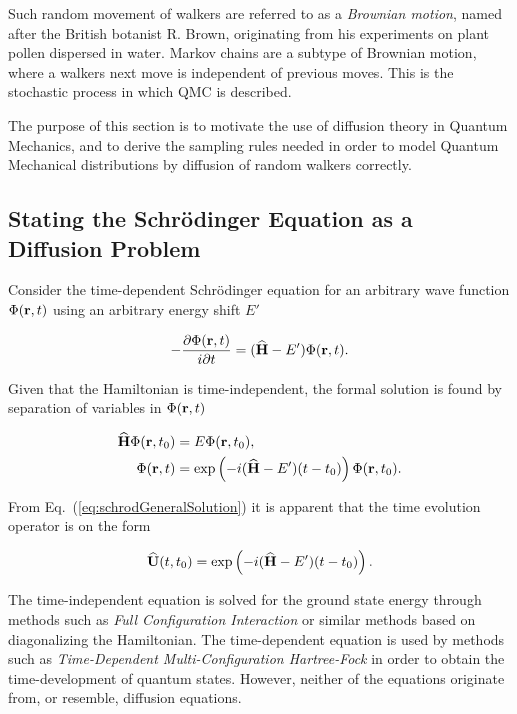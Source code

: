 Such random movement of walkers are referred to as a \textit{Brownian motion}, named after the British botanist R. Brown, originating from his experiments on plant pollen dispersed in water. Markov chains are a subtype of Brownian motion, where a walkers next move is independent of previous moves. This is the stochastic process in which QMC is described.

The purpose of this section is to motivate the use of diffusion theory in Quantum Mechanics, and to derive the sampling rules needed in order to model Quantum Mechanical distributions by diffusion of random walkers correctly. 

\subsection{Stating the Schrödinger Equation as a Diffusion Problem}
\label{sec:statingDiff}

Consider the time-dependent Schrödinger equation for an arbitrary wave function $\Phi(\mathbf{r}, t)$ using an arbitrary energy shift $E'$

\begin{equation}
 -\frac{\partial \Phi(\mathbf{r}, t)}{i\partial t} = ({\bf\widehat{H}} - E')\Phi(\mathbf{r}, t).
\end{equation}

Given that the Hamiltonian is time-independent, the formal solution is found by separation of variables in $\Phi(\mathbf{r}, t)$ \cite{griffiths}

\begin{align}
 {\bf\widehat{H}}\Phi(\mathbf{r}, t_0) &= E\Phi(\mathbf{r}, t_0), \label{eq:schrodTimeIndie}\\
 \Phi(\mathbf{r}, t) &= \exp\left(-i({\bf\widehat{H}} - E')(t-t_0)\right)\Phi(\mathbf{r}, t_0). \label{eq:schrodGeneralSolution}
\end{align}

From Eq.~(\ref{eq:schrodGeneralSolution}) it is apparent that the time evolution operator is on the form

\begin{equation}
 {\bf\widehat{U}}(t, t_0) = \exp\left(-i({\bf\widehat{H}} - E')(t-t_0)\right). \label{eq:TimeEvolOp}
\end{equation}


The time-independent equation is solved for the ground state energy through methods such as \textit{Full Configuration Interaction} \cite{Shavitt} or similar methods based on diagonalizing the Hamiltonian. The time-dependent equation is used by methods such as \textit{Time-Dependent Multi-Configuration Hartree-Fock} in order to obtain the time-development of quantum states. However, neither of the equations originate from, or resemble, diffusion equations. 

